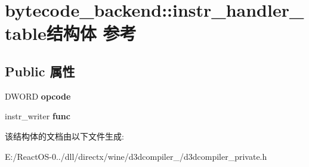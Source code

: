 \hypertarget{structbytecode__backend_1_1instr__handler__table}{}\section{bytecode\+\_\+backend\+:\+:instr\+\_\+handler\+\_\+table结构体 参考}
\label{structbytecode__backend_1_1instr__handler__table}
\subsection*{Public 属性}
\begin{DoxyCompactItemize}
\item 
\mbox{\label{structbytecode__backend_1_1instr__handler__table_a0ac2a469a42cee3b29235aad5cb554f9}} 
D\+W\+O\+RD {\bfseries opcode}
\item 
\mbox{\label{structbytecode__backend_1_1instr__handler__table_a025921a44b2b13732ac514e155ee0343}} 
instr\+\_\+writer {\bfseries func}
\end{DoxyCompactItemize}


该结构体的文档由以下文件生成\+:\begin{DoxyCompactItemize}
\item 
E\+:/\+React\+O\+S-\/0../dll/directx/wine/d3dcompiler\+\_/d3dcompiler\+\_\+private.\+h\end{DoxyCompactItemize}
